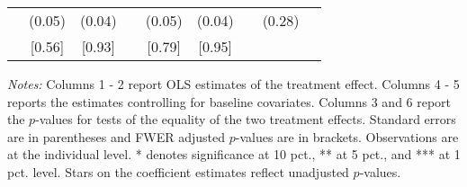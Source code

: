 \begin{table}[htbp]
{\begin{threeparttable}
\begin{tabular}{l*{8}{c}}
          &   (0.05)&   (0.04)&         &   (0.05)&   (0.04)&         &   (0.28)&         \\
          &   [0.56]&   [0.93]&         &   [0.79]&   [0.95]&         &         &         \\
\bottomrule \end{tabular} \begin{tablenotes}[flushleft] \footnotesize \item \emph{Notes:} Columns 1 - 2 report OLS estimates of the treatment effect. Columns 4 - 5 reports the estimates controlling for baseline covariates. Columns 3 and 6 report the \(p\)-values for tests of the equality of the two treatment effects. Standard errors are in parentheses and FWER adjusted \(p\)-values are in brackets. Observations are at the individual level. * denotes significance at 10 pct., ** at 5 pct., and *** at 1 pct. level. Stars on the coefficient estimates reflect unadjusted \(p\)-values. \end{tablenotes} \end{threeparttable} } \end{table}

